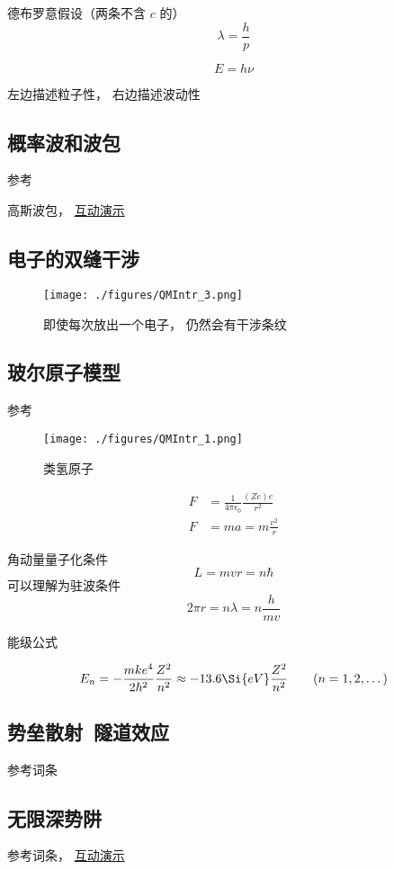 德布罗意假设（两条不含 $c$ 的）
\begin{equation}
\lambda = \frac{h}{p}
\end{equation}

\begin{equation}
E = h\nu
\end{equation}

左边描述粒子性， 右边描述波动性

\subsection{概率波和波包}
参考

高斯波包， \href{http://wuli.wiki/apps/gausWP.html}{互动演示}

\subsection{电子的双缝干涉}

\begin{figure}[ht]
\centering
\texttt{[image: ./figures/QMIntr\_3.png]}
\caption{即使每次放出一个电子， 仍然会有干涉条纹} \label{QMIntr_fig3}
\end{figure}

\subsection{玻尔原子模型}

参考

\begin{figure}[ht]
\centering
\texttt{[image: ./figures/QMIntr\_1.png]}
\caption{类氢原子} \label{QMIntr_fig1}
\end{figure}

\begin{equation}
\begin{aligned}
F &= \frac{1}{4\pi \epsilon_0} \frac{(Ze)e}{r^2}
\\
F &= ma = m\frac{v^2}{r}
\end{aligned}
\end{equation}

角动量量子化条件
\begin{equation}
L = mvr = n\hbar
\end{equation}
可以理解为驻波条件
\begin{equation}
2\pi r = n \lambda = n \frac{h}{mv}
\end{equation}

能级公式

\begin{equation}
E_n =  - \frac{m k e^4}{2 \hbar ^2} \frac{Z^2}{n^2} \approx - 13.6\Si{eV} \frac{Z^2}{n^2}
\qquad (n = 1, 2, \dots)
\end{equation}

\subsection{势垒散射\ 隧道效应}
参考词条

\subsection{无限深势阱}
参考词条， \href{http://wuli.wiki/apps/QMISW.html}{互动演示}
